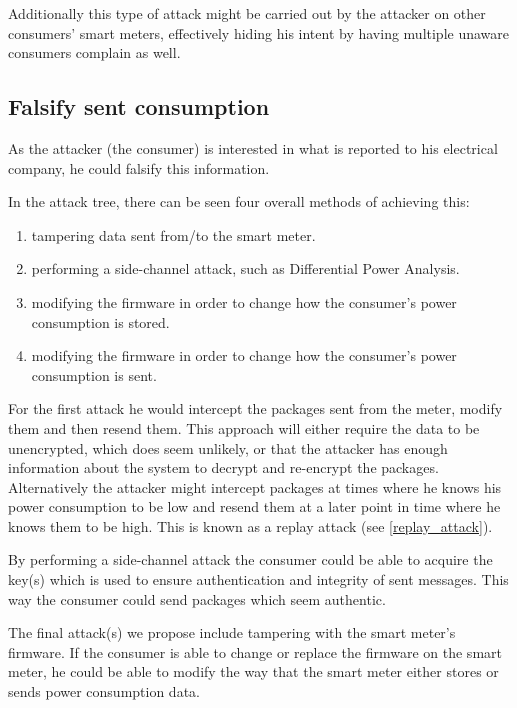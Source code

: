 Additionally this type of attack might be carried out by the attacker on other consumers' smart meters, effectively hiding his intent by having multiple unaware consumers complain as well.

\subsection{Falsify sent consumption}
As the attacker (the consumer) is interested in what is reported to his electrical company, he could falsify this information.

In the attack tree, there can be seen four overall methods of achieving this:
\begin{enumerate}
  \item tampering data sent from/to the smart meter.
  \item performing a side-channel attack, such as Differential Power Analysis.
  \item modifying the firmware in order to change how the consumer's power consumption is stored.
  \item modifying the firmware in order to change how the consumer's power consumption is sent.
\end{enumerate}

For the first attack he would intercept the packages sent from the meter, modify them and then resend them.
This approach will either require the data to be unencrypted, which does seem unlikely, or that the attacker has enough information about the system to decrypt and re-encrypt the packages.
Alternatively the attacker might intercept packages at times where he knows his power consumption to be low and resend them at a later point in time where he knows them to be high.
This is known as a replay attack (see \cref{replay_attack}).

By performing a side-channel attack the consumer could be able to acquire the key(s) which is used to ensure authentication and integrity of sent messages.
This way the consumer could send packages which seem authentic.

The final attack(s) we propose include tampering with the smart meter's firmware.
If the consumer is able to change or replace the firmware on the smart meter, he could be able to modify the way that the smart meter either stores or sends power consumption data.
